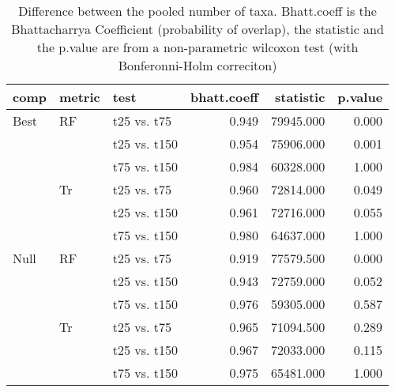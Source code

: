 \begin{table}[ht]
\centering
\begin{tabular}{lllrrr}
  \hline
comp & metric & test & bhatt.coeff & statistic & p.value \\ 
  \hline
Best & RF & t25 vs. t75 & 0.949 & 79945.000 & 0.000 \\ 
   &  & t25 vs. t150 & 0.954 & 75906.000 & 0.001 \\ 
   &  & t75 vs. t150 & 0.984 & 60328.000 & 1.000 \\ 
   & Tr & t25 vs. t75 & 0.960 & 72814.000 & 0.049 \\ 
   &  & t25 vs. t150 & 0.961 & 72716.000 & 0.055 \\ 
   &  & t75 vs. t150 & 0.980 & 64637.000 & 1.000 \\ 
  Null & RF & t25 vs. t75 & 0.919 & 77579.500 & 0.000 \\ 
   &  & t25 vs. t150 & 0.943 & 72759.000 & 0.052 \\ 
   &  & t75 vs. t150 & 0.976 & 59305.000 & 0.587 \\ 
   & Tr & t25 vs. t75 & 0.965 & 71094.500 & 0.289 \\ 
   &  & t25 vs. t150 & 0.967 & 72033.000 & 0.115 \\ 
   &  & t75 vs. t150 & 0.975 & 65481.000 & 1.000 \\ 
   \hline
\end{tabular}
\caption{Difference between the pooled number of taxa. Bhatt.coeff is the Bhattacharrya Coefficient (probability of overlap), the statistic and the p.value are from a non-parametric wilcoxon test (with Bonferonni-Holm correciton)} 
\label{Full_Tab_pooledstaxa_test}
\end{table}
